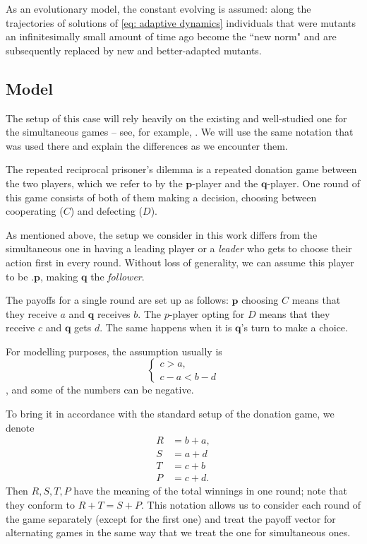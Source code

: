 \documentclass{article}
\def\p{\mathbf{p}}
\def\q{\mathbf{q}}
\theoremstyle{definition}
\numberwithin{equation}{section}
\begin{document}
As an evolutionary model, the constant evolving is assumed: along the trajectories of solutions of \eqref{eq: adaptive dynamics} individuals that were mutants an infinitesimally small amount of time ago become the ``new norm" and are subsequently replaced by new and better-adapted mutants. 

\subsection{Model}
\label{sec:model}
The setup of this case will rely heavily on the existing and well-studied one for the simultaneous games -- see, for example, \cite{balabanova2024adaptive, laporte2023adaptive}. We will use the same notation that was used there and explain the differences as we encounter them. 

The repeated reciprocal prisoner's dilemma is a repeated donation game between the two players, which we refer to by the $\p$-player and the $\q$-player.  One round of this game consists of both of them making a decision, choosing  between cooperating ($C$) and defecting ($D$). 

As mentioned above, the  setup we consider in this work  differs from the simultaneous one in  having a leading player or a \textit{leader} who gets to choose their action first in every round. Without loss of generality, we can assume this player to be $.\p$, making $\q$ the \textit{follower}.

The payoffs for a single round are set up as follows: $\p$ choosing $C$ means that they receive $a$ and $\q$ receives  $b$. The $p$-player opting for  $D$ means that they receive $c$ and $\q$ gets  $d$. The same happens when it is $\q$'s turn to make a choice. 

For modelling purposes, the  assumption usually  is 
\begin{equation}
\label{eq:conditions}
    \begin{cases}
        c>a,\\
        c-a<b-d
    \end{cases}
\end{equation}, and  some of the numbers can be negative.  

To bring it in accordance with the standard setup of the donation game, we  denote
\begin{equation*}
    \begin{split}
        R&=b+a,\\
        S&=a+d\\
        T&=c+b\\
        P&=c+d.
    \end{split}
\end{equation*}
Then $R,S,T,P$ have the meaning of the total winnings in one round; note that they conform to $R+T = S+P$. This notation allows us to consider each round of the game separately (except for the first one) and treat the payoff vector for alternating games in the same way that we treat the one for simultaneous ones. 
\end{document}
